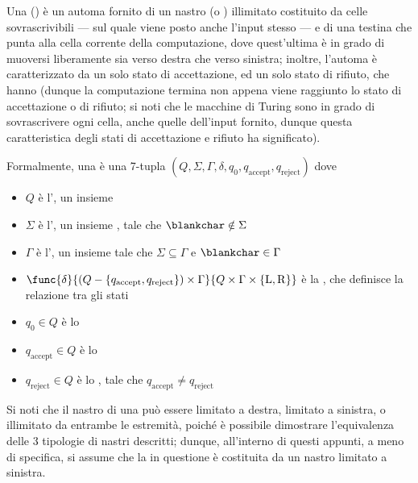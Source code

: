 \documentclass[a4paper, 12pt]{report}
\begin{document}
    \begin{frameddefn}[label={tm},breakable]{\TM}
        Una \tbf{\TM} () è un automa fornito di un nastro (o ) illimitato costituito da celle sovrascrivibili --- sul quale viene posto anche l'input stesso --- e di una testina che punta alla cella corrente della computazione, dove quest'ultima è in grado di muoversi liberamente sia verso destra che verso sinistra; inoltre, l'automa è caratterizzato da un solo stato di accettazione, ed un solo stato di rifiuto, che hanno  (dunque la computazione termina non appena viene raggiunto lo stato di accettazione o di rifiuto; si noti che le macchine di Turing sono in grado di sovrascrivere ogni cella, anche quelle dell'input fornito, dunque questa caratteristica degli stati di accettazione e rifiuto ha significato).

        Formalmente, una \TM è una 7-tupla $(Q, \Sigma, \Gamma, \delta, q_0, q_\mathrm{accept}, q_\mathrm{reject})$ dove

        \begin{itemize}
            \item $Q$ è l', un insieme 
            \item $\Sigma$ è l', un insieme , tale che $\blankchar \notin \Sigma$
            \item $\Gamma$ è l', un insieme  tale che $\Sigma \subseteq \Gamma$ e $\blankchar \in \Gamma$
            \item $\func{\delta}{(Q- \{q_\mathrm{accept}, q_\mathrm{reject}\}) \times \Gamma}{Q \times \Gamma \times \{ \mathrm L, \mathrm R\}}$ è la , che definisce la relazione tra gli stati
            \item $q_0 \in Q$ è lo 
            \item $q_\mathrm{accept} \in Q$ è lo 
            \item $q_\mathrm{reject} \in Q$ è lo , tale che $q_\mathrm{accept} \neq q_\mathrm{reject}$
        \end{itemize}

        Si noti che il nastro di una \TM può essere limitato a destra, limitato a sinistra, o illimitato da entrambe le estremità, poiché è possibile dimostrare l'equivalenza delle 3 tipologie di nastri descritti; dunque, all'interno di questi appunti, a meno di specifica, si assume che la \TM in questione è costituita da un nastro limitato a sinistra.


\end{frameddefn}
\end{document}
